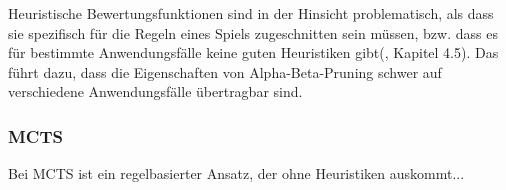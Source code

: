 Heuristische Bewertungsfunktionen sind in der Hinsicht problematisch, als dass sie spezifisch für die Regeln eines Spiels zugeschnitten sein müssen, bzw. dass es für bestimmte Anwendungsfälle keine guten Heuristiken gibt(\cite{Ferguson.January2019}, Kapitel 4.5). Das führt dazu, dass die Eigenschaften von Alpha-Beta-Pruning schwer auf verschiedene Anwendungsfälle übertragbar sind.

\subsubsection{MCTS}

Bei MCTS ist ein regelbasierter Ansatz, der ohne Heuristiken auskommt...